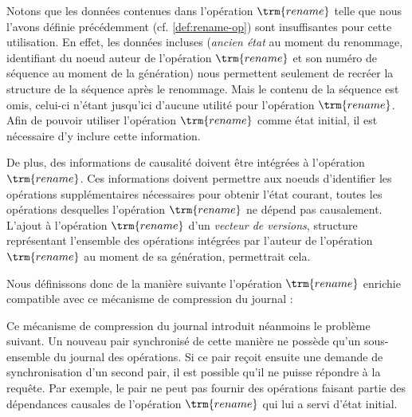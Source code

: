 Notons que les données contenues dans l'opération $\trm{rename}$ telle que nous l'avons définie précédemment (cf. \autoref{def:rename-op}) sont insuffisantes pour cette utilisation.
En effet, les données incluses (\emph{ancien état} au moment du renommage, identifiant du noeud auteur de l'opération $\trm{rename}$ et son numéro de séquence au moment de la génération) nous permettent seulement de recréer la structure de la séquence après le renommage.
Mais le contenu de la séquence est omis, celui-ci n'étant jusqu'ici d'aucune utilité pour l'opération $\trm{rename}$.
Afin de pouvoir utiliser l'opération $\trm{rename}$ comme état initial, il est nécessaire d'y inclure cette information.

De plus, des informations de causalité doivent être intégrées à l'opération $\trm{rename}$.
Ces informations doivent permettre aux noeuds d'identifier les opérations supplémentaires nécessaires pour obtenir l'état courant, \ie toutes les opérations desquelles l'opération $\trm{rename}$ ne dépend pas causalement.
L'ajout à l'opération $\trm{rename}$ d'un \emph{vecteur de versions}, structure représentant l'ensemble des opérations intégrées par l'auteur de l'opération $\trm{rename}$ au moment de sa génération, permettrait cela.

Nous définissons donc de la manière suivante l'opération $\trm{rename}$ enrichie compatible avec ce mécanisme de compression du journal :

\indent{}
Ce mécanisme de compression du journal introduit néanmoins le problème suivant.
Un nouveau pair synchronisé de cette manière ne possède qu'un sous-ensemble du journal des opérations.
Si ce pair reçoit ensuite une demande de synchronisation d'un second pair, il est possible qu'il ne puisse répondre à la requête.
Par exemple, le pair ne peut pas fournir des opérations faisant partie des dépendances causales de l'opération $\trm{rename}$ qui lui a servi d'état initial.

